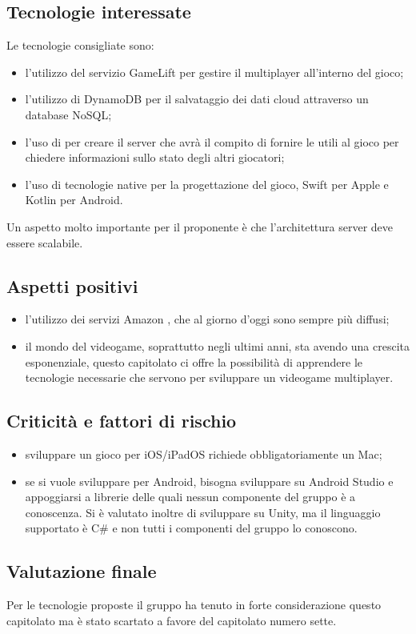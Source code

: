 \subsection{Tecnologie interessate}
Le tecnologie consigliate sono:
\begin{itemize}
\item l'utilizzo del servizio  GameLift per gestire il multiplayer all'interno del gioco;
\item l'utilizzo di  DynamoDB per il salvataggio dei dati cloud attraverso un database NoSQL;
\item l'uso di  per creare il server che avrà il compito di fornire le  utili al gioco per chiedere informazioni sullo stato degli altri giocatori;
\item l'uso di tecnologie native per la progettazione del gioco, Swift per Apple e Kotlin per Android.
\end{itemize}
Un aspetto molto importante per il proponente è che l'architettura server deve essere scalabile.

\subsection{Aspetti positivi}
\begin{itemize}
\item l'utilizzo dei servizi Amazon , che al giorno d'oggi sono sempre più diffusi;
\item il mondo del videogame, soprattutto negli ultimi anni, sta avendo una crescita esponenziale, questo capitolato ci offre la possibilità di apprendere le tecnologie necessarie che servono per sviluppare un videogame multiplayer.
\end{itemize}

\subsection{Criticità e fattori di rischio}
\begin{itemize}
\item sviluppare un gioco per iOS/iPadOS richiede obbligatoriamente un Mac;
\item se si vuole sviluppare per Android, bisogna sviluppare su Android Studio e appoggiarsi a librerie delle quali nessun componente del gruppo è a conoscenza. Si è valutato inoltre di sviluppare su Unity, ma il linguaggio supportato è C\# e non tutti i componenti del gruppo lo conoscono.
\end{itemize}

\subsection{Valutazione finale}
Per le tecnologie proposte il gruppo \textit{\Gruppo{}} ha tenuto in forte considerazione questo capitolato ma è stato scartato a favore del capitolato numero sette.